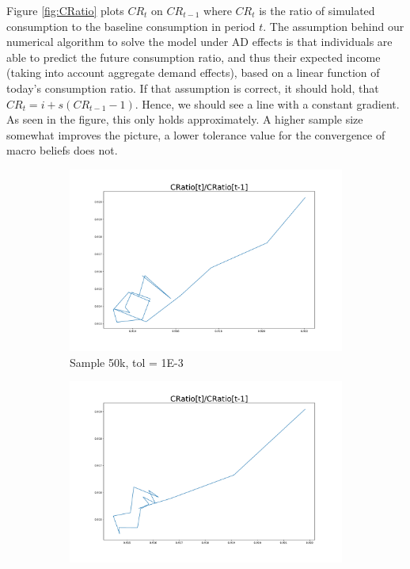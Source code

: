\documentclass[]{article}
\begin{document}
Figure \ref{fig:CRatio} plots $CR_t$ on  $CR_{t-1}$ where $CR_t$ is the ratio of simulated consumption to the baseline consumption in period $t$. The assumption behind our numerical algorithm to solve the model under AD effects is that individuals are able to predict the future consumption ratio, and thus their expected income (taking into account aggregate demand effects), based on a linear function of today's consumption ratio. If that assumption is correct, it should hold, that $CR_t = i + s (CR_{t-1} - 1 )$. Hence, we should see a line with a constant gradient. As seen in the figure, this only holds approximately. A higher sample size somewhat improves the picture, a lower tolerance value for the convergence of macro beliefs does not.

\begin{figure}
	\centering
	\begin{subfigure}[b]{0.45\textwidth}
		\centering
		\includegraphics[width=1.2\textwidth]{../50kSample_BaseCal/CRatio.pdf}
		\caption{Sample 50k, tol = 1E-3}
		\label{fig:Cratio-50k-Baseline}
	\end{subfigure}
	\hfill
	\begin{subfigure}[b]{0.45\textwidth}
		\centering
		\includegraphics[width=1.2\textwidth]{../200kSample_BaseCal/CRatio.pdf}

\end{subfigure}
\end{figure}
\end{document}
